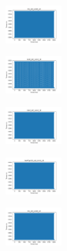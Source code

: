 \vspace*{\fill}
\newpage
\vspace*{\fill}

\begin{figure}[H]    
    \centering
    \begin{subfigure}
        \centering
        \includegraphics[width=0.234\textwidth]{img/ageun/iris_set_const_10_949004259_time.png}
    \end{subfigure}
    \hfill
    \begin{subfigure}
        \centering
        \includegraphics[width=0.234\textwidth]{img/ageun/ecoli_set_const_10_949004259_time.png}
    \end{subfigure}
    \hfill
    \begin{subfigure}
        \centering
        \includegraphics[width=0.234\textwidth]{img/ageun/rand_set_const_10_949004259_time.png}
    \end{subfigure}
    \hfill
    \begin{subfigure}
        \centering
        \includegraphics[width=0.234\textwidth]{img/ageun/newthyroid_set_const_10_949004259_time.png}
    \end{subfigure}
    \hfill
    \begin{subfigure}
        \centering
        \includegraphics[width=0.234\textwidth]{img/ageun/iris_set_const_10_589741062_time.png}

\end{subfigure}
\end{figure}
